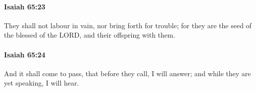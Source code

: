 		\paragraph{Isaiah 65:23} %
			\label{ISAIAH-65-23}

			They shall not labour in vain, nor bring forth for trouble; for they are the seed of the blessed of the LORD, and their offspring with them.


		\paragraph{Isaiah 65:24} %
			\label{ISAIAH-65-24}

			And it shall come to pass, that before they call, I will answer; and while they are yet speaking, I will hear.



